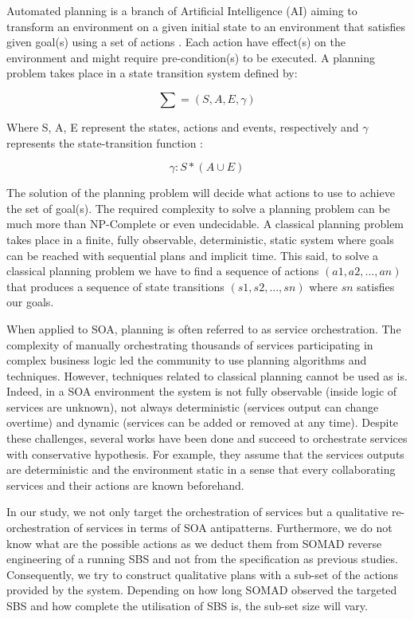 \documentclass[lnbip]{svmultln}
\begin{document}
Automated planning is a branch of Artificial Intelligence (AI) aiming to transform an environment on a given initial state to an environment that satisfies given goal(s) using a set of actions \cite{ghallab2004automated}. Each action have  effect(s) on the environment and might require pre-condition(s) to be executed. A planning problem takes place in a state transition system defined by:

\begin{equation}
\sum  = (S, A, E, \gamma)
\end{equation}

Where S, A, E represent the states, actions and events, respectively and $\gamma$ represents the state-transition function :

\begin{equation}
\gamma: S * (A \cup E)
\end{equation}

The solution of the planning problem will decide what actions to use to achieve the set of goal(s). The required complexity to solve a planning problem can be much more than NP-Complete or even undecidable. 
 A classical planning problem takes place in a finite, fully observable, deterministic, static system where goals can be reached with sequential plans and implicit time. This said, to solve a classical planning problem we have to find a sequence of actions $(a1, a2, ... , an)$ that produces a sequence of state transitions $(s1, s2, ..., sn)$ where $sn$ satisfies our goals. 

When applied to SOA, planning is often referred to as service orchestration. The complexity of manually orchestrating thousands of services participating in complex business logic led the community to use planning algorithms and techniques. However, techniques related to classical planning cannot be used as is. Indeed, in a SOA environment the system is not fully observable (inside logic of services are unknown), not always deterministic (services output can change overtime) and dynamic (services can be added or removed at any time). Despite these challenges, several works have been done and succeed to orchestrate services with conservative hypothesis. For example, they assume that the services outputs are deterministic and the environment static in a sense that every collaborating services and their actions are known beforehand. 

	In our study, we not only target the orchestration of services but a qualitative re-orchestration of services in terms of SOA antipatterns. Furthermore, we do not know what are the possible actions as we deduct them from SOMAD reverse engineering of a running SBS and not from the specification as previous studies. Consequently, we try to construct qualitative plans with a sub-set of the actions provided by the system. Depending on how long SOMAD observed the targeted SBS and how complete the utilisation of SBS is, the sub-set size will vary.
\end{document}
